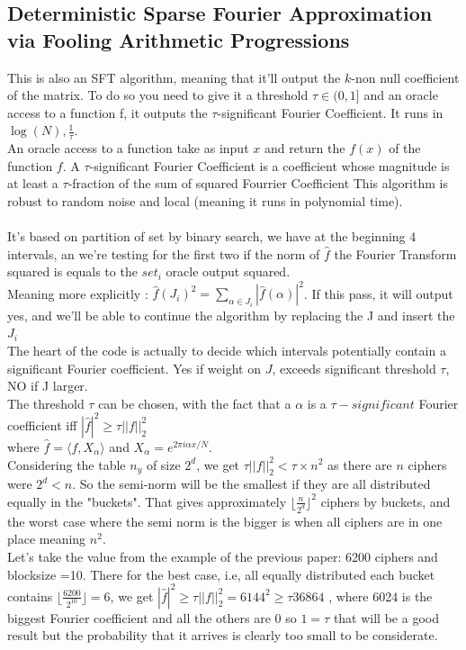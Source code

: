 \documentclass{article}
\begin{document}
\subsection{Deterministic Sparse Fourier Approximation via Fooling Arithmetic Progressions}
This is also an SFT algorithm, meaning that it'll output the $k$-non null coefficient of the matrix. To do so you need to give it a threshold $\tau \in (0,1]$ and an oracle access to a function f, it outputs the $\tau$-significant Fourier Coefficient. It runs in $\log(N),\frac{1}{\tau}$.\\
An oracle access to a function take as input $x$ and return the $f(x)$ of the function $f$. A $\tau$-significant Fourier Coefficient is a coefficient whose magnitude is at least a $\tau$-fraction of the sum of squared Fourrier Coefficient
This algorithm is robust to random noise and local (meaning it runs in polynomial time).\\
\\
It's based on partition of set by binary search, we have at the beginning 4 intervals, an we're testing for the first two if the norm of $\hat{f}$ the Fourier Transform squared is equals to the $set_i$ oracle output squared.\\
Meaning more explicitly : $\hat{f}(J_i)^2 = \sum_{\alpha \in J_i}{|\hat{f}(\alpha)|^2}$. If this pass, it will output yes, and we'll be able to continue the algorithm by replacing the J and insert the $J_i$\\
The heart of the code is actually to decide which intervals potentially contain a significant Fourier coefficient. Yes if weight on $J$, exceeds significant threshold $\tau$, NO if J larger.\\
The threshold $\tau$ can be chosen, with the fact that a $\alpha$ is a $\tau -significant$ Fourier coefficient iff $|\hat{f}|^2 \geq \tau||f||^{2}_2$\\ where $\hat{f} = \langle f,X_{\alpha} \rangle$ and $X_{\alpha} = e^{2\pi i \alpha x/N}$.\\
Considering the table $n_y$ of size $2^d$, we get $\tau||f||^{2}_2 < \tau \times n^2$ as there are $n$ ciphers were $2^d <n$. So the semi-norm will be the smallest if they are all distributed equally in the "buckets". That gives approximately ${\lfloor \frac{n}{2^d} \rfloor}^{2}$ ciphers by buckets, and the worst case where the semi norm is the bigger is when all ciphers are in one place meaning $n^2$.\\
Let's take the value from the example of the previous paper: 6200 ciphers and blocksize =10. There for the best case, i.e, all equally distributed each bucket contains ${\lfloor \frac{6200}{2^{10}} \rfloor} = 6$, we get $|\hat{f}|^2 \geq \tau||f||^{2}_2 =  6144^2 \geq \tau 36864$ , where 6024 is the biggest Fourier coefficient and all the others are 0 so $ 1 = \tau$ that will be a good result but the probability that it arrives is clearly too small to be considerate.\\
\end{document}
